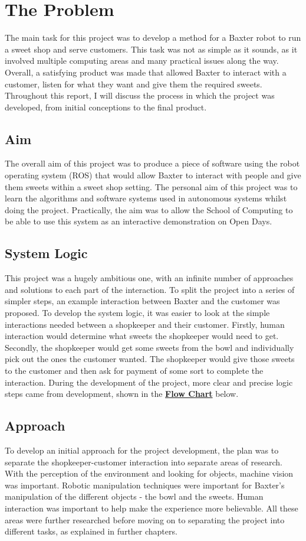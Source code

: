 \chapter{The Problem}
\setcounter{page}{1}
\label{chapter0}
The main task for this project was to develop a method for a Baxter robot to run a sweet shop and serve customers. This task was not as simple as it sounds, as it involved multiple computing areas and many practical issues along the way. Overall, a satisfying product was made that allowed Baxter to interact with a customer, listen for what they want and give them the required sweets. Throughout this report, I will discuss the process in which the project was developed, from initial conceptions to the final product.
\section{Aim}
The overall aim of this project was to produce a piece of software using the robot operating system (ROS) that would allow Baxter to interact with people and give them sweets within a sweet shop setting. The personal aim of this project was to learn the algorithms and software systems used in autonomous systems whilst doing the project. Practically, the aim was to allow the School of Computing to be able to use this system as an interactive demonstration on Open Days.
\section{System Logic}
This project was a hugely ambitious one, with an infinite number of approaches and solutions to each part of the interaction. To split the project into a series of simpler steps, an example interaction between Baxter and the customer was proposed. To develop the system logic, it was easier to look at the simple interactions needed between a shopkeeper and their customer. Firstly, human interaction would determine what sweets the shopkeeper would need to get. Secondly, the shopkeeper would get some sweets from the bowl and individually pick out the ones the customer wanted. The shopkeeper would give those sweets to the customer and then ask for payment of some sort to complete the interaction. During the development of the project, more clear and precise logic steps came from development, shown in the \hyperref[ch:flowchart]{\textbf{Flow Chart}} below.
\section{Approach}
To develop an initial approach for the project development, the plan was to separate the shopkeeper-customer interaction into separate areas of research. With the perception of the environment and looking for objects, machine vision was important. Robotic manipulation techniques were important for Baxter's manipulation of the different objects - the bowl and the sweets. Human interaction was important to help make the experience more believable. All these areas were further researched before moving on to separating the project into different tasks, as explained in further chapters.
